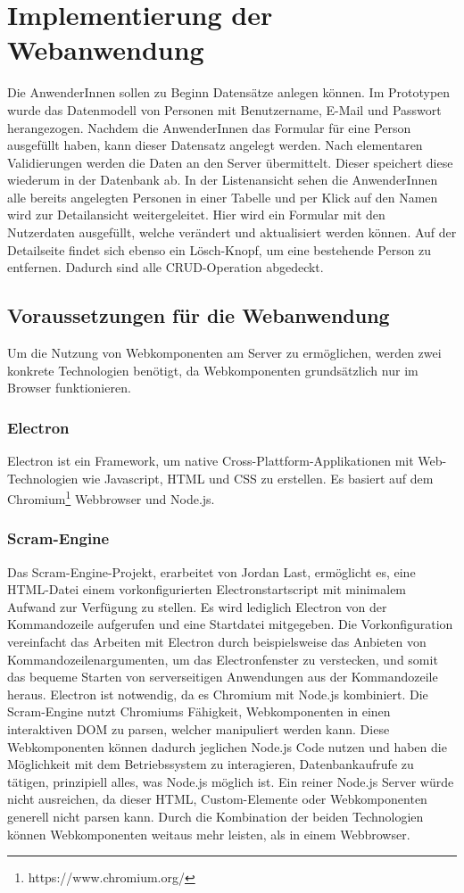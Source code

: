 \chapter{Implementierung der Webanwendung}

Die AnwenderInnen sollen zu Beginn Datensätze anlegen können. Im Prototypen wurde das Datenmodell von Personen mit Benutzername, E-Mail und Passwort herangezogen.
Nachdem die AnwenderInnen das Formular für eine Person ausgefüllt haben, kann dieser Datensatz angelegt werden. Nach elementaren Validierungen werden die Daten an den Server übermittelt. Dieser speichert diese wiederum in der Datenbank ab. 
In der Listenansicht sehen die AnwenderInnen alle bereits angelegten Personen in einer Tabelle und per Klick auf den Namen wird zur Detailansicht weitergeleitet. Hier wird ein Formular mit den Nutzerdaten ausgefüllt, welche verändert und aktualisiert werden können.   
Auf der Detailseite findet sich ebenso ein Lösch-Knopf, um eine bestehende Person zu entfernen. Dadurch sind alle CRUD-Operation abgedeckt.
\section{Voraussetzungen für die Webanwendung}
Um die Nutzung von Webkomponenten am Server zu ermöglichen, werden zwei konkrete Technologien benötigt, da Webkomponenten grundsätzlich nur im Browser funktionieren.
\subsection{Electron}
Electron ist ein Framework, um native Cross-Plattform-Applikationen mit Web-Technologien wie Javascript, HTML und CSS zu erstellen. Es basiert auf dem Chromium\footnote{https://www.chromium.org/} Webbrowser und Node.js.
\subsection{Scram-Engine}
\label{cha:scram-engine}
Das Scram-Engine-Projekt, erarbeitet von Jordan Last, ermöglicht es, eine HTML-Datei einem vorkonfigurierten Electronstartscript mit minimalem Aufwand zur Verfügung zu stellen. Es wird lediglich Electron von der Kommandozeile aufgerufen und eine Startdatei mitgegeben. Die Vorkonfiguration vereinfacht das Arbeiten mit Electron durch beispielsweise das Anbieten von Kommandozeilenargumenten, um das Electronfenster zu verstecken, und somit das bequeme Starten von serverseitigen Anwendungen aus der Kommandozeile heraus.
Electron ist notwendig, da es Chromium mit Node.js kombiniert. Die Scram-Engine nutzt Chromiums Fähigkeit, Webkomponenten in einen interaktiven DOM zu parsen, welcher manipuliert werden kann. Diese Webkomponenten können dadurch jeglichen Node.js Code nutzen und haben die Möglichkeit mit dem Betriebssystem zu interagieren, Datenbankaufrufe zu tätigen, prinzipiell alles, was Node.js möglich ist.
Ein reiner Node.js Server würde nicht ausreichen, da dieser HTML, Custom-Elemente oder Webkomponenten generell nicht parsen kann.
Durch die Kombination der beiden Technologien können Webkomponenten weitaus mehr leisten, als in einem Webbrowser.

